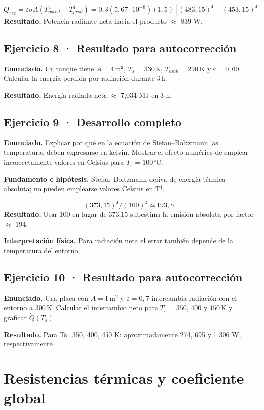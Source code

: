 \documentclass[11pt,a4paper]{article}
\begin{document}
\[
\dot Q_{rec}=\varepsilon\sigma A(T_{pared}^4-T_{prod}^4)=0{,}8(5{,}67\cdot10^{-8})(1{,}5)[(483{,}15)^4-(453{,}15)^4]
\]
\textbf{Resultado.} Potencia radiante neta hacia el producto \ensuremath{\approx} 839 W.


\subsection*{Ejercicio 8 · Resultado para autocorrección}
\textbf{Enunciado.} Un tanque tiene \(A=4\,\mathrm m^2\), \(T_s=330\,\mathrm K\), \(T_{amb}=290\,\mathrm K\) y \(\varepsilon=0{,}60\). Calcular la energía perdida por radiación durante \(3\,\mathrm h\).

\textbf{Resultado.} Energía radiada neta \ensuremath{\approx} 7,034 MJ en 3 h.


\subsection*{Ejercicio 9 · Desarrollo completo}
\textbf{Enunciado.} Explicar por qué en la ecuación de Stefan--Boltzmann las temperaturas deben expresarse en kelvin. Mostrar el efecto numérico de emplear incorrectamente valores en Celsius para \(T_s=100\,^\circ\mathrm C\).

\textbf{Fundamento e hipótesis.} Stefan--Boltzmann deriva de energía térmica absoluta; no pueden emplearse valores Celsius en T\ensuremath{^4}.

\[
(373{,}15)^4/(100)^4\simeq193{,}8
\]
\textbf{Resultado.} Usar 100 en lugar de 373,15 subestima la emisión absoluta por factor \ensuremath{\approx} 194.

\textbf{Interpretación física.} Para radiación neta el error también depende de la temperatura del entorno.


\subsection*{Ejercicio 10 · Resultado para autocorrección}
\textbf{Enunciado.} Una placa con \(A=1\,\mathrm m^2\) y \(\varepsilon=0{,}7\) intercambia radiación con el entorno a \(300\,\mathrm K\). Calcular el intercambio neto para \(T_s=350\), \(400\) y \(450\,\mathrm K\) y graficar \(\dot Q(T_s)\).

\textbf{Resultado.} Para Ts=350, 400, 450 K: aproximadamente 274, 695 y 1 306 W, respectivamente.


\clearpage

\section{Resistencias térmicas y coeficiente global}
\end{document}

